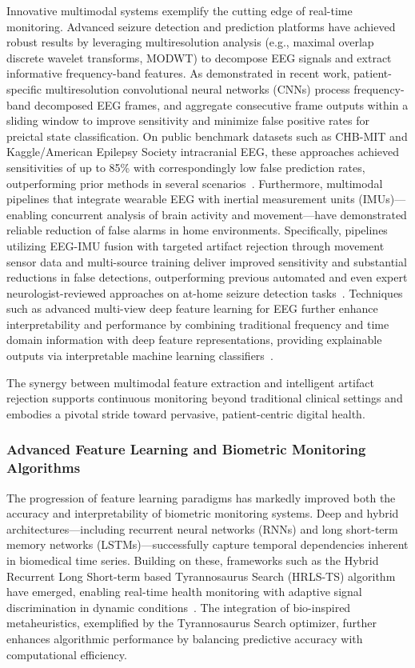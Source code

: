 \documentclass[sigconf]{acmart}
\begin{document}
Innovative multimodal systems exemplify the cutting edge of real-time monitoring. Advanced seizure detection and prediction platforms have achieved robust results by leveraging multiresolution analysis (e.g., maximal overlap discrete wavelet transforms, MODWT) to decompose EEG signals and extract informative frequency-band features. As demonstrated in recent work, patient-specific multiresolution convolutional neural networks (CNNs) process frequency-band decomposed EEG frames, and aggregate consecutive frame outputs within a sliding window to improve sensitivity and minimize false positive rates for preictal state classification. On public benchmark datasets such as CHB-MIT and Kaggle/American Epilepsy Society intracranial EEG, these approaches achieved sensitivities of up to 85\% with correspondingly low false prediction rates, outperforming prior methods in several scenarios~\cite{ref102}. Furthermore, multimodal pipelines that integrate wearable EEG with inertial measurement units (IMUs)—enabling concurrent analysis of brain activity and movement—have demonstrated reliable reduction of false alarms in home environments. Specifically, pipelines utilizing EEG-IMU fusion with targeted artifact rejection through movement sensor data and multi-source training deliver improved sensitivity and substantial reductions in false detections, outperforming previous automated and even expert neurologist-reviewed approaches on at-home seizure detection tasks~\cite{ref103}. Techniques such as advanced multi-view deep feature learning for EEG further enhance interpretability and performance by combining traditional frequency and time domain information with deep feature representations, providing explainable outputs via interpretable machine learning classifiers~\cite{ref98}.

The synergy between multimodal feature extraction and intelligent artifact rejection supports continuous monitoring beyond traditional clinical settings and embodies a pivotal stride toward pervasive, patient-centric digital health.

\subsubsection{Advanced Feature Learning and Biometric Monitoring Algorithms}

The progression of feature learning paradigms has markedly improved both the accuracy and interpretability of biometric monitoring systems. Deep and hybrid architectures—including recurrent neural networks (RNNs) and long short-term memory networks (LSTMs)—successfully capture temporal dependencies inherent in biomedical time series. Building on these, frameworks such as the Hybrid Recurrent Long Short-term based Tyrannosaurus Search (HRLS-TS) algorithm have emerged, enabling real-time health monitoring with adaptive signal discrimination in dynamic conditions~\cite{ref107}. The integration of bio-inspired metaheuristics, exemplified by the Tyrannosaurus Search optimizer, further enhances algorithmic performance by balancing predictive accuracy with computational efficiency.
\end{document}
